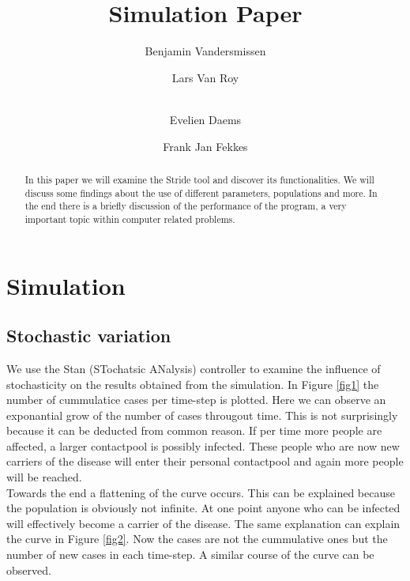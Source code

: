 \documentclass[runningheads]{llncs}
\begin{document}
%
\title{Simulation Paper}

\author{Benjamin Vandersmissen \and
Lars Van Roy \and \\
Evelien Daems \and
Frank Jan Fekkes}
%
%
%
\maketitle              %
%
\begin{abstract}
In this paper we will examine the Stride tool and discover its functionalities.
We will discuss some findings about the use of different parameters, populations and more.
In the end there is a briefly discussion of the performance of the program, a very important topic within computer related problems.

\end{abstract}

\section{Simulation}

\subsection{Stochastic variation}
We use the Stan (STochatsic ANalysis) controller to examine the influence of stochasticity on the results obtained from the simulation. \newline
In Figure \ref{fig1} the number of cummulatice cases per time-step is plotted. Here we can observe an exponantial grow of the number of cases througout time. This is not surprisingly because it can be deducted from common reason. If per time more people are affected, a larger contactpool is possibly infected. These people who are now new carriers of the disease will enter their personal contactpool and again more people will be reached.\\
Towards the end a flattening of the curve occurs. This can be explained because the population is obviously not infinite. At one point anyone who can be infected will effectively become a carrier of the disease. \newline
The same explanation can explain the curve in Figure \ref{fig2}. Now the cases are not the cummulative ones but the number of new cases in each time-step. A similar course of the curve can be observed.
\end{document}
